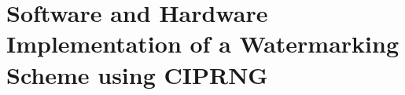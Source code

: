 \chapter{Software and Hardware Implementation of a Watermarking Scheme using CIPRNG}
\label{Application Example}
\minitoc



%
%
%
%
%
%
%
